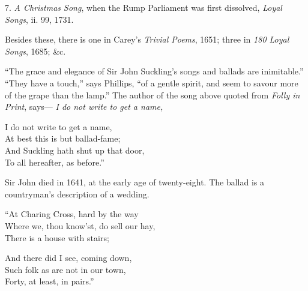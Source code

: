7. \textit{A Christmas Song}, when the Rump Parliament was first dissolved, \textit{Loyal
Songs}, ii. 99, 1731.

Besides these, there is one in Carey’s \textit{Trivial Poems}, 1651; three in \textit{180 Loyal
Songs}, 1685; \&c.

“The grace and elegance of Sir John Suckling’s songs and ballads are inimitable.”
“They have a touch,” says Phillips, “of a gentle spirit, and seem
\pagebreak
to savour more of the grape than the lamp.” The author of the song above
quoted from \textit{Folly in Print}, says—
\textit{I do not write to get a name,}

\begin{dcverse}I do not write to get a name,\\
At best this is but ballad-fame;\\
And Suckling hath shut up that door,\\
To all hereafter, as before.”
\end{dcverse}


Sir John died in 1641, at the early age of twenty-eight. The ballad is a
countryman’s description of a wedding.



\begin{dcverse}
\begin{patverse}
“At Charing Cross, hard by the way\\
Where we, thou know’st, do sell our hay,\\
There is a house with stairs;
\end{patverse}

\begin{patverse}
And there did I see, coming down,\\
Such folk as are not in our town,\\
Forty, at least, in pairs.”
\end{patverse}
\end{dcverse}

